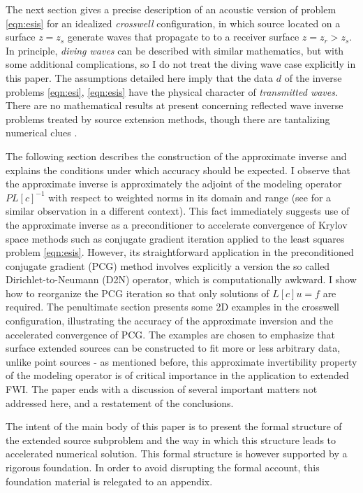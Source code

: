 The next section gives a precise description of an acoustic version of problem \ref{eqn:esis} for an idealized {\em crosswell} configuration, in which source located on a surface $z=z_s$ generate waves that propagate to to a receiver surface $z=z_r > z_s$. In principle, {\em diving waves} can be described with similar mathematics, but with some additional complications, so I do not treat the diving wave case explicitly in this paper. The assumptions detailed here imply that the data $d$ of the inverse problems \ref{eqn:esi}, \ref{eqn:esis} have the physical character of {\em transmitted waves}. There are no mathematical results at present concerning reflected wave inverse problems treated by source extension methods, though there are tantalizing numerical clues \cite[]{LeeuwenHerrmannWRI:13,Warner:14,Warner:16,LeeuwenHerrmann:16,HuangSymes:Geo17,HuangSymes:Geo18a,HuangSymes:Geo18b}.

The following section describes the construction of the approximate
inverse and explains the conditions under which accuracy should be expected. I observe that the approximate inverse is approximately the adjoint of the modeling operator $PL[c]^{-1}$ with respect to weighted norms in its domain and range (see \cite{HouSymes:15} for a similar observation in a different context). This fact immediately suggests use of the approximate inverse as a preconditioner to accelerate convergence of Krylov space methods such as conjugate gradient iteration applied to the least squares problem \ref{eqn:esis}. However, its straightforward application in the preconditioned conjugate gradient (PCG) method \cite[]{Golub:2012} involves explicitly a version the so called Dirichlet-to-Neumann (D2N) operator, which is computationally awkward. I show how to reorganize the PCG iteration so that only solutions of $L[c]u=f$ are required. The penultimate section presents some 2D examples in the crosswell configuration, illustrating the accuracy of the approximate inversion and the accelerated convergence of PCG. The examples are chosen to emphasize that surface extended sources can be constructed to fit more or less arbitrary data, unlike point sources - as mentioned before, this approximate invertibility property of the modeling operator is of critical importance in the application to extended FWI. The paper ends with a discussion of several important matters not addressed here, and a restatement of the conclusions.

The intent of the main body of this paper is to present the formal structure of the extended source subproblem and the way in which this structure leads to accelerated numerical solution. This formal structure is however supported by a rigorous foundation. In order to avoid disrupting the formal account, this foundation material is relegated to an appendix.


